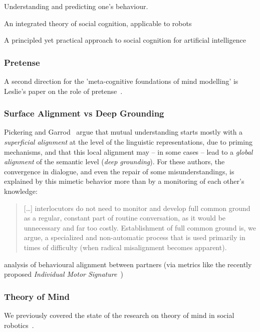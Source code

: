 \documentclass[a4paper]{article}
\begin{document}
Understanding and predicting one's behaviour.

An integrated theory of social cognition, applicable to robots

A principled yet practical approach to social cognition for artificial intelligence

\subsubsection{Pretense}

A second direction for the 'meta-cognitive foundations of mind modelling' is
Leslie's paper on the role of pretense~\cite{leslie1987pretense}.

\subsubsection{Surface Alignment vs Deep Grounding}

Pickering and Garrod~\cite{pickering2006alignment} argue that mutual understanding
starts mostly with a \emph{superficial alignment} at the level of the linguistic
representations, due to priming mechanisms, and that this local alignment may --
in some cases -- lead to a \emph{global alignment} of the semantic level
(\emph{deep grounding}).  For these authors, the convergence in dialogue, and
even the repair of some misunderstandings, is explained by this mimetic behavior
more than by a monitoring of each other's knowledge:

\begin{quote}
[\ldots] interlocutors do
not need to monitor and develop full common ground as a regular, constant
part of routine conversation, as it would be unnecessary and far too costly.
Establishment of full common ground is, we argue, a specialized and
non-automatic process that is used primarily in times of difficulty (when
radical misalignment becomes apparent).~\citep[p.179]{pickering2006alignment}
\end{quote}


analysis of behavioural alignment between partners (via
metrics like the recently proposed \emph{Individual Motor
Signature}~\cite{slowinski2016dynamic})

\subsubsection{Theory of Mind}

We previously covered the state of the research on theory of mind in social
robotics~\cite{lemaignan2015mutual}.
\end{document}
